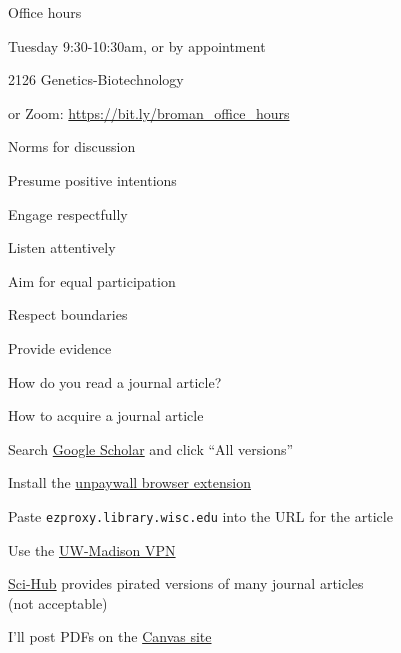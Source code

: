 \documentclass[aspectratio=169,12pt,t]{beamer}
\begin{document}
\begin{frame}{Office hours}

  \bbi
\item Tuesday 9:30-10:30am, {\hilit or by appointment}
\item 2126 Genetics-Biotechnology
\item or Zoom: \url{https://bit.ly/broman_office_hours}
\ei

\end{frame}






\begin{frame}{Norms for discussion}

      \bbi
    \item Presume positive intentions
    \item Engage respectfully
    \item Listen attentively
    \item Aim for equal participation
    \item Respect boundaries
    \item Provide evidence
      \ei

\end{frame}




\begin{frame}[c]{}

\centerline{\Large \color{title} How do you read a journal article?}

\end{frame}



\begin{frame}[c,fragile]{How to acquire a journal article}

  \bbi

\item Search \href{https://scholar.google.com}{Google Scholar} and click ``All \uline{\mbox{\hspace{2em}}} versions''

\item Install the
  \href{https://unpaywall.org/products/extension}{unpaywall browser  extension}

\item Paste {\tt ezproxy.library.wisc.edu} into the URL for the
  article

\item Use the
  \href{https://vpn.wisc.edu/}{UW-Madison VPN}

\item \href{https://sci-hub.se}{Sci-Hub} provides pirated versions of many
  journal articles \\
  ({\vhilit not} acceptable)

\item I'll post PDFs on the \href{https://canvas.wisc.edu}{Canvas site}

  \ei
\end{frame}
\end{document}
